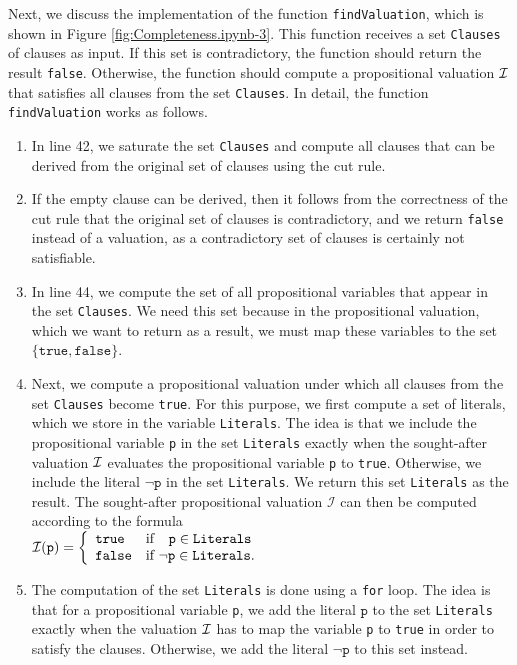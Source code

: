 Next, we discuss the implementation of the function \texttt{findValuation}, which is shown in
Figure \ref{fig:Completeness.ipynb-3}. This function receives a set \texttt{Clauses} of clauses as input.
If this set is contradictory, the function should return the result \texttt{false}.
Otherwise, the function should compute a propositional valuation $\mathcal{I}$ that satisfies all clauses from the set
\texttt{Clauses}. 
In detail, the function \texttt{findValuation} works as follows.
\begin{enumerate}
\item In line 42, we saturate the set \texttt{Clauses} and compute all clauses that can be derived from the
      original set of clauses using the cut rule.
\item If the empty clause can be derived, then it follows from the correctness of the cut rule
      that the original set of clauses is contradictory, and we return \texttt{false} instead of a valuation,
      as a contradictory set of clauses is certainly not satisfiable.
\item In line 44, we compute the set of all propositional variables that appear in the set
      \texttt{Clauses}. We need this set because in the
      propositional valuation, which we want to return as a result, we must
      map these variables to the set $\{ \texttt{true}, \texttt{false} \}$.
\item Next, we compute a propositional valuation under which all clauses from
      the set \texttt{Clauses} become \texttt{true}. For this purpose, we first compute a set of
      literals, which we store in the variable \texttt{Literals}. The idea is that we
      include the propositional variable \texttt{p} in the set \texttt{Literals} exactly when
      the sought-after valuation $\mathcal{I}$ evaluates the propositional
      variable \texttt{p} to \texttt{true}. Otherwise, we include the
      literal $\neg \texttt{p}$ in the set \texttt{Literals}.  We return this set \texttt{Literals} as the result.
      The sought-after propositional valuation
      $\mathcal{I}$ can then be computed according to the formula  
      \\[0.2cm]
      \hspace*{1.3cm}
      $\mathcal{I}(\texttt{p}) = \left\{
             \begin{array}{ll}
               \texttt{true}  & \mbox{if $\hspace*{0.25cm}\texttt{p} \in \texttt{Literals}$} \\
               \texttt{false} & \mbox{if $\neg\texttt{p} \in \texttt{Literals}$.}
             \end{array}\right.
            $
\item The computation of the set \texttt{Literals} is done using a \texttt{for} loop.
      The idea is that for a propositional variable \texttt{p}, we add the literal
      $\texttt{p}$ to the set \texttt{Literals} exactly when the valuation $\mathcal{I}$ has to map the variable \texttt{p}
      to \texttt{true} in order to satisfy the clauses. Otherwise, we add
      the literal $\neg\texttt{p}$ to this set instead.


\end{enumerate}
